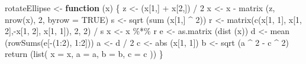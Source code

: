 \documentclass[
  12pt,
]{book}
\newenvironment{Shaded}{\begin{snugshade}}{\end{snugshade}}
\newcommand{\AttributeTok}[1]{\textcolor[rgb]{0.77,0.63,0.00}{#1}}
\newcommand{\ConstantTok}[1]{\textcolor[rgb]{0.00,0.00,0.00}{#1}}
\newcommand{\ControlFlowTok}[1]{\textcolor[rgb]{0.13,0.29,0.53}{\textbf{#1}}}
\newcommand{\DecValTok}[1]{\textcolor[rgb]{0.00,0.00,0.81}{#1}}
\newcommand{\FunctionTok}[1]{\textcolor[rgb]{0.00,0.00,0.00}{#1}}
\newcommand{\NormalTok}[1]{#1}
\newcommand{\OtherTok}[1]{\textcolor[rgb]{0.56,0.35,0.01}{#1}}
\newcommand{\SpecialCharTok}[1]{\textcolor[rgb]{0.00,0.00,0.00}{#1}}
\theoremstyle{definition}
\theoremstyle{definition}
\theoremstyle{definition}
\theoremstyle{definition}
\theoremstyle{remark}
\begin{document}
\begin{Shaded}
\begin{Highlighting}[]
\NormalTok{rotateEllipse }\OtherTok{\textless{}{-}} \ControlFlowTok{function}\NormalTok{ (x) \{}
\NormalTok{  z }\OtherTok{\textless{}{-}}\NormalTok{ (x[}\DecValTok{1}\NormalTok{,] }\SpecialCharTok{+}\NormalTok{ x[}\DecValTok{2}\NormalTok{,]) }\SpecialCharTok{/} \DecValTok{2}
\NormalTok{  x }\OtherTok{\textless{}{-}}\NormalTok{ x }\SpecialCharTok{{-}} \FunctionTok{matrix}\NormalTok{ (z, }\FunctionTok{nrow}\NormalTok{(x), }\DecValTok{2}\NormalTok{, }\AttributeTok{byrow =} \ConstantTok{TRUE}\NormalTok{)}
\NormalTok{  s }\OtherTok{\textless{}{-}} \FunctionTok{sqrt}\NormalTok{ (}\FunctionTok{sum}\NormalTok{ (x[}\DecValTok{1}\NormalTok{,] }\SpecialCharTok{\^{}} \DecValTok{2}\NormalTok{))}
\NormalTok{  r }\OtherTok{\textless{}{-}} \FunctionTok{matrix}\NormalTok{(}\FunctionTok{c}\NormalTok{(x[}\DecValTok{1}\NormalTok{, }\DecValTok{1}\NormalTok{], x[}\DecValTok{1}\NormalTok{, }\DecValTok{2}\NormalTok{],}\SpecialCharTok{{-}}\NormalTok{x[}\DecValTok{1}\NormalTok{, }\DecValTok{2}\NormalTok{], x[}\DecValTok{1}\NormalTok{, }\DecValTok{1}\NormalTok{]), }\DecValTok{2}\NormalTok{, }\DecValTok{2}\NormalTok{) }\SpecialCharTok{/}\NormalTok{ s}
\NormalTok{  x }\OtherTok{\textless{}{-}}\NormalTok{ x }\SpecialCharTok{\%*\%}\NormalTok{ r}
\NormalTok{  e }\OtherTok{\textless{}{-}} \FunctionTok{as.matrix}\NormalTok{ (}\FunctionTok{dist}\NormalTok{ (x))}
\NormalTok{  d }\OtherTok{\textless{}{-}} \FunctionTok{mean}\NormalTok{ (}\FunctionTok{rowSums}\NormalTok{(e[}\SpecialCharTok{{-}}\NormalTok{(}\DecValTok{1}\SpecialCharTok{:}\DecValTok{2}\NormalTok{), }\DecValTok{1}\SpecialCharTok{:}\DecValTok{2}\NormalTok{]))}
\NormalTok{  a }\OtherTok{\textless{}{-}}\NormalTok{ d }\SpecialCharTok{/} \DecValTok{2}
\NormalTok{  c }\OtherTok{\textless{}{-}} \FunctionTok{abs}\NormalTok{ (x[}\DecValTok{1}\NormalTok{, }\DecValTok{1}\NormalTok{])}
\NormalTok{  b }\OtherTok{\textless{}{-}} \FunctionTok{sqrt}\NormalTok{ (a }\SpecialCharTok{\^{}} \DecValTok{2} \SpecialCharTok{{-}}\NormalTok{ c }\SpecialCharTok{\^{}} \DecValTok{2}\NormalTok{)}
  \FunctionTok{return}\NormalTok{ (}\FunctionTok{list}\NormalTok{(}
    \AttributeTok{x =}\NormalTok{ x,}
    \AttributeTok{a =}\NormalTok{ a,}
    \AttributeTok{b =}\NormalTok{ b,}
    \AttributeTok{c =}\NormalTok{ c}
\NormalTok{  ))}
\NormalTok{\}}


\end{Highlighting}
\end{Shaded}
\end{document}
